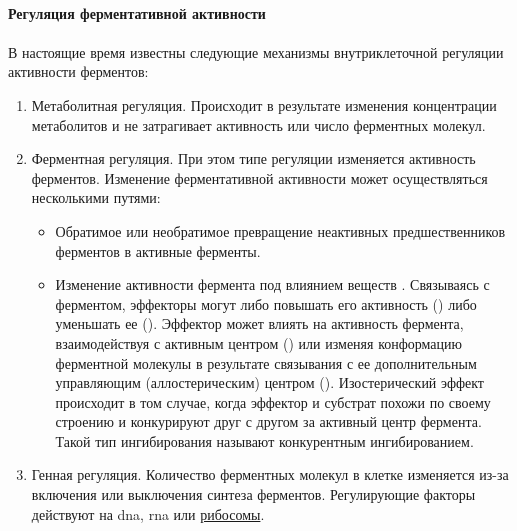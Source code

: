 \paragraph{Регуляция ферментативной активности}

\paragraph*{}В настоящие время известны следующие механизмы внутриклеточной регуляции активности ферментов:

\begin{enumerate}

	\item Метаболитная регуляция. Происходит в результате изменения концентрации метаболитов и не затрагивает активность или число ферментных молекул.

	\item Ферментная регуляция. При этом типе регуляции изменяется активность ферментов. Изменение ферментативной активности может осуществляться несколькими путями: 
	\begin{itemize}
		\item Обратимое или необратимое превращение неактивных предшественников ферментов в активные ферменты. 
		\item Изменение активности фермента под влиянием веществ . Связываясь с ферментом, эффекторы могут либо повышать его активность () либо уменьшать ее (). Эффектор может влиять на активность фермента, взаимодействуя с активным центром () или изменяя конформацию ферментной молекулы в результате связывания с ее дополнительным управляющим (аллостерическим) центром (). Изостерический эффект происходит в том случае, когда эффектор и субстрат похожи по своему строению и конкурируют друг с другом за активный центр фермента. Такой тип ингибирования называют конкурентным ингибированием.
	\end{itemize}

	\item Генная регуляция. Количество ферментных молекул в клетке изменяется из-за включения или выключения синтеза ферментов. Регулирующие факторы действуют на \gls{dna}, \gls{rna} или \hyperlink{sect_rybosoms}{рибосомы}.


\end{enumerate}
